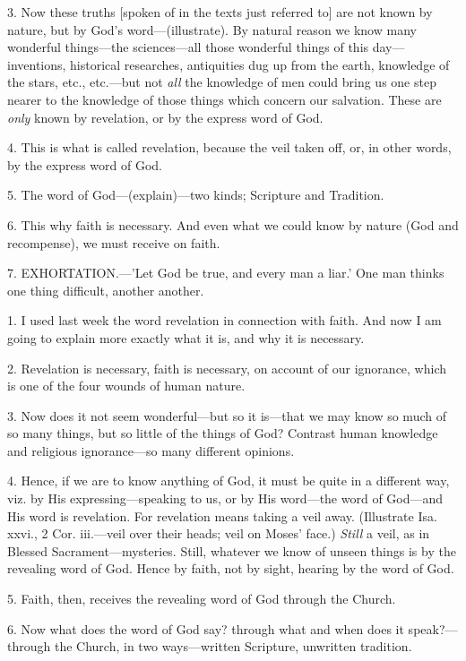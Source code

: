 3. Now these truths [spoken of in the texts just
referred to] are not known by nature, but by God's
word—(illustrate). By natural reason we know many wonderful
things—the sciences—all those wonderful things of this
day—inventions, historical researches, antiquities dug up from the
earth, knowledge of the stars, etc., etc.—but not \emph{all} the
knowledge of men could bring us one step nearer to the knowledge of
those things which concern our salvation. These are \emph{only} known
by revelation, or by the express word of God.

4. This is what is called revelation, because the
veil taken off, or, in other words, by the express word of God.

5. The word of God—(explain)—two kinds;
Scripture and Tradition.

6. This why faith is necessary. And even what we
could know by nature (God and recompense), we must receive on faith.

7. EXHORTATION.—'Let
God be true, and every man a liar.' One man thinks one thing
difficult, another another.


1. I used last week the word revelation in
connection with faith. And now I am going to explain more exactly what
it is, and why it is necessary.

2. Revelation is necessary, faith is necessary,
on account of our ignorance, which is one of the four wounds of human
nature.

3. Now does it not seem wonderful—but so it
is—that we may know so much of so many things, but so little of the
things of God? Contrast human knowledge and religious ignorance—so
many different opinions.

4. Hence, if we are to know anything of God, it
must be quite in a different way, viz. by His expressing—speaking to
us, or by His word—the word of God—and His word is revelation. For
revelation means taking a veil away. (Illustrate Isa. xxvi., 2 Cor.
iii.—veil over their heads; veil on Moses' face.) \emph{Still} a
veil, as in Blessed Sacrament—mysteries. Still, whatever we know of
unseen things is by the revealing word of God. Hence by faith, not by
sight, hearing by the word of God.

5. Faith, then, receives the revealing word of
God through the Church.

6. Now what does the word of God say? through
what and when does it speak?—through the Church, in two
ways—written Scripture, unwritten tradition.

